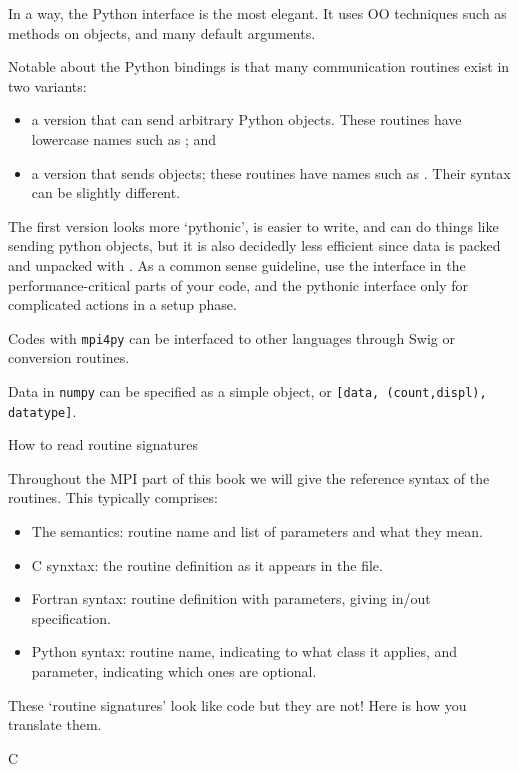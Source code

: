 In a way, the Python interface is the most elegant. It uses \ac{OO}
techniques such as methods on objects, and many default arguments.

Notable about the Python bindings is that many communication routines
exist in two variants:
\begin{itemize}
\item a version that can send arbitrary Python objects. These routines
  have lowercase names such as ; and
\item a version that sends  objects; these routines
  have names such as . Their syntax can be slightly different.
\end{itemize}
The first version looks more `pythonic', is easier to write,
and can do things like sending python objects,
but it is also decidedly less efficient since data is packed
and unpacked with . As a common sense guideline,
use the  interface in the performance-critical parts
of your code, and the pythonic interface only for complicated
actions in a setup phase.

Codes with \texttt{mpi4py} can be interfaced to other languages
through Swig or conversion routines.

Data in \texttt{numpy} can be specified as a simple object,
or \texttt{[data, (count,displ), datatype]}.


 {How to read routine signatures}
\label{sec:protos}

Throughout the MPI part of this book we will give the reference syntax
of the routines. This typically comprises:
\begin{itemize}
\item The semantics: routine name and list of parameters and what they
  mean.
\item C synxtax: the routine definition as it appears in the
   file.
\item Fortran syntax: routine definition with parameters, giving
  in/out specification.
\item Python syntax: routine name, indicating to what class it
  applies, and parameter, indicating which ones are optional.
\end{itemize}

These `routine signatures' look like code but they are not! Here is
how you translate them.

 {C}

